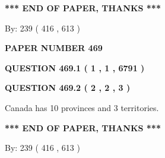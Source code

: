 \documentclass[12pt]{article}
\begin{document}
   
   
\vspace{1.0in} 
{\textbf{\large{ *** END OF PAPER, THANKS *** }}} 
   
   
\hspace{1.0in} By: 
 239 ( 416 ,  613 )
   
   
   
   
\newpage 
\setcounter{page}{ 
   469001 } 
   
   
   
   
 {\textbf{ \Large{ PAPER NUMBER  469  }}}
   
   
\vspace{0.2in}
   
   
   
   
   
   
 \vspace{0.2in}
 
 
 
 
   
   
  
\vspace{0.2in}
  
{\textbf{\Large{QUESTION
469.1 
 ( 1 , 1 , 6791 )
}}}
  
  
  
\vspace{0.2in}
  
{\textbf{\Large{QUESTION
469.2 
 ( 2 , 2 , 3 )
}}}
  
  
 
 
\noindent{}
 
 
Canada has 10  provinces and 3 territories.
 
 
 
 
   
   
 \vspace{0.2in}
 
   
   
   
   
\vspace{1.0in} 
{\textbf{\large{ *** END OF PAPER, THANKS *** }}} 
   
   
\hspace{1.0in} By: 
 239 ( 416 ,  613 )
   
   
   
   
\newpage 
\setcounter{page}{ 
   470001 } 
   
\end{document}
